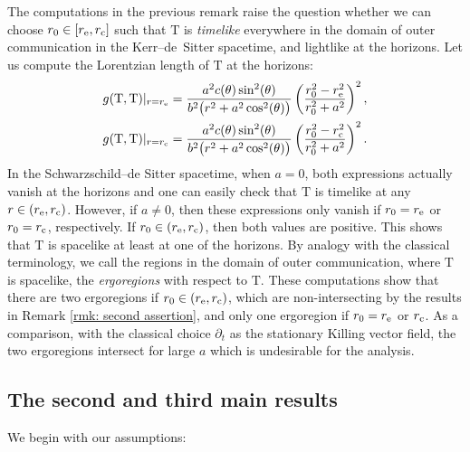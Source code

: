 \documentclass[pdftex]{sigma}
\renewcommand{\d}{\partial}
\newcommand{\T}{\mathrm T}
\numberwithin{equation}{section}
\begin{document}
\begin{Remark} \label{rmk: time inv}
The computations in the previous remark raise the question whether we can choose $r_0 \in [r_{\rm e}, r_{\rm c}]$ such that $\T$ is \emph{timelike} everywhere in the domain of outer communication in the Kerr--de~Sitter spacetime, and lightlike at the horizons.
Let us compute the Lorentzian length of $\T$ at the horizons:
\begin{align*}
	g(\T,\T)|_{r = r_{\rm e}}
		= \frac{a^2 c(\theta)\sin^2(\theta)}{b^2\big(r^2 + a^2 \cos^2(\theta)\big)}\left(\frac{r_0^2-r_{\rm e}^2}{r_0^2 + a^2}\right)^2, \\
	g(\T,\T)|_{r = r_{\rm c}}
		= \frac{a^2 c(\theta)\sin^2(\theta)}{b^2\big(r^2 + a^2 \cos^2(\theta)\big)}\left(\frac{r_0^2-r_{\rm c}^2}{r_0^2 + a^2}\right)^2.
\end{align*}
In the Schwarzschild--de Sitter spacetime, when $a = 0$, both expressions actually vanish at the horizons and one can easily check that $\T$ is timelike at any $r \in (r_{\rm e}, r_{\rm c})$.
However, if $a \neq 0$, then these expressions only vanish if $r_0 = r_{\rm e}$ or $r_0 = r_{\rm c}$, respectively.
If $r_0 \in (r_{\rm e}, r_{\rm c})$, then both values are positive.
This shows that $\T$ is spacelike at least at one of the horizons.
By analogy with the classical terminology, we call the regions in the domain of outer communication, where $\T$ is spacelike, the \emph{ergoregions} with respect to $\T$.
These computations show that there are two ergoregions if $r_0 \in (r_{\rm e}, r_{\rm c})$, which are non-intersecting by the results in Remark \ref{rmk: second assertion}, and only one ergoregion if $r_0 = r_{\rm e}$ or $r_{\rm c}$.
As a comparison, with the classical choice $\d_t$ as the stationary Killing vector field, the two ergoregions intersect for large $a$ which is undesirable for the analysis.
\end{Remark}


\subsection{The second and third main results}\label{subsec:second result}
We begin with our assumptions:
\end{document}
